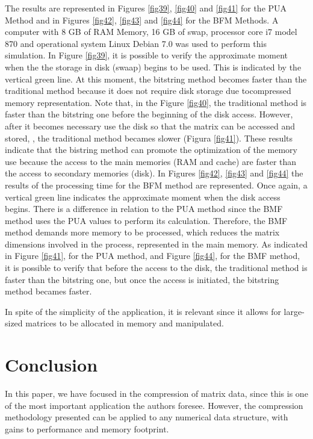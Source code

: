 \documentclass[10pt]{article}
\begin{document}
The results are represented in Figures \ref{fig39}, \ref{fig40} and \ref{fig41} for the PUA Method and in Figures 
\ref{fig42}, \ref{fig43} and \ref{fig44} for the 
BFM Methods.  A computer with 8 GB of RAM Memory, 16 GB of swap, processor core i7 model 870  
and operational 
system Linux Debian 7.0 was used to perform this simulation. In Figure \ref{fig39}, it is possible to verify the approximate 
moment  when the  the storage in disk (swaap) begins to be used. This is indicated by the vertical green line. 
At this moment, the bitstring method becomes faster than the traditional method because it does not require disk 
storage due tocompressed memory representation. Note that, in the Figure \ref{fig40}, the traditional method is faster 
than the bitstring one before the beginning of the disk access. However, after it becomes necessary use the disk 
so that the matrix can be accessed and stored, , the traditional method  becames slower (Figura \ref{fig41}). 
These results 
indicate that the bistring method can promote the optimization of the memory use because the access to the main 
memories (RAM and cache) are faster than the access to secondary memories (disk). In Figures \ref{fig42}, 
\ref{fig43} and \ref{fig44} the 
results of the processing time for  the BFM method are represented. Once again, a vertical green line indicates 
the approximate moment when the disk access begins. There is a difference in relation to the PUA method since the 
BMF method uses the PUA values to perform its calculation. Therefore, the BMF method demands more memory to be 
processed, which reduces the matrix dimensions involved in the process, represented in the main memory. As 
indicated in Figure \ref{fig41}, for the PUA method, and Figure \ref{fig44}, for the BMF method, it is possible 
to verify that 
before the access to the disk, the traditional method is faster than the bitstring one, but once the access 
is initiated,  the bitstring method becames faster.

In spite of the simplicity of the application, it is relevant since  it allows for large-sized matrices to be 
allocated in memory and manipulated.

\section*{Conclusion}

In this paper, we have focused in the compression of matrix data, since this is
one of the most important application the authors foresee. However, the
compression methodology presented can be applied to any numerical data
structure, with gains to performance and memory footprint\cite{teseCrysttian}. 
\end{document}
